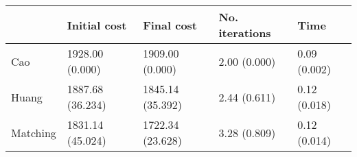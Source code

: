 \begin{tabular}{lllll}
\toprule
{} &      Initial cost &        Final cost & No. iterations &          Time \\
\midrule
Cao      &   1928.00 (0.000) &   1909.00 (0.000) &   2.00 (0.000) &  0.09 (0.002) \\
Huang    &  1887.68 (36.234) &  1845.14 (35.392) &   2.44 (0.611) &  0.12 (0.018) \\
Matching &  1831.14 (45.024) &  1722.34 (23.628) &   3.28 (0.809) &  0.12 (0.014) \\
\bottomrule
\end{tabular}
